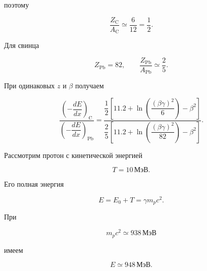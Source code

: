 \documentclass[../final.tex]{subfiles}
\begin{document}
поэтому

\begin{equation*}
    \frac{Z_{\mathrm C}}{A_{\mathrm C}}
    \simeq
    \frac{6}{12}
    =
    \frac{1}{2}.
\end{equation*}

Для свинца

\begin{equation*}
    Z_{\mathrm{Pb}}=82,
    \qquad
    \frac{Z_{\mathrm{Pb}}}{A_{\mathrm{Pb}}}
    \simeq
    \frac{2}{5}.
\end{equation*}

При одинаковых $z$ и $\beta$ получаем

\begin{equation*}
    \frac{
        \left(
            -\dfrac{dE}{dx}
        \right)_{\mathrm C}
    }{
        \left(
            -\dfrac{dE}{dx}
        \right)_{\mathrm{Pb}}
    }
    =
    \frac{
        \dfrac{1}{2}
        \left[
            11.2
            +
            \ln
            \left(
                \dfrac{
                    (\beta\gamma)^2
                }{
                    6
                }
            \right)
            -
            \beta^2
        \right]
    }{
        \dfrac{2}{5}
        \left[
            11.2
            +
            \ln
            \left(
                \dfrac{
                    (\beta\gamma)^2
                }{
                    82
                }
            \right)
            -
            \beta^2
        \right]
    }.
\end{equation*}

Рассмотрим протон с кинетической энергией

\begin{equation*}
    T
    =
    10\,\text{МэВ}.
\end{equation*}

Его полная энергия

\begin{equation*}
    E
    =
    E_0+T
    =
    \gamma m_pc^2.
\end{equation*}

При

\begin{equation*}
    m_pc^2
    \simeq
    938\,\text{МэВ}
\end{equation*}

имеем

\begin{equation*}
    E
    \simeq
    948\,\text{МэВ}.
\end{equation*}
\end{document}
